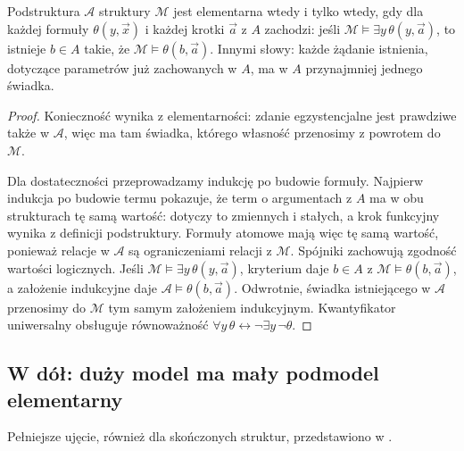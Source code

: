\begin{lemat}\label{res:14:4}
Podstruktura $\mathcal A$ struktury $\mathcal M$ jest elementarna wtedy i tylko wtedy, gdy dla każdej formuły $\theta(y,\vec x)$ i każdej krotki $\vec a$ z $A$ zachodzi: jeśli $\mathcal M\models\exists y\,\theta(y,\vec a)$, to istnieje $b\in A$ takie, że $\mathcal M\models\theta(b,\vec a)$. Innymi słowy: każde żądanie istnienia, dotyczące parametrów już zachowanych w $A$, ma w $A$ przynajmniej jednego świadka.
\end{lemat}
\begin{proof}
Konieczność wynika z elementarności: zdanie egzystencjalne jest prawdziwe także w $\mathcal A$, więc ma tam świadka, którego własność przenosimy z powrotem do $\mathcal M$.

Dla dostateczności przeprowadzamy indukcję po budowie formuły. Najpierw indukcja po budowie termu pokazuje, że term o argumentach z $A$ ma w obu strukturach tę samą wartość: dotyczy to zmiennych i stałych, a krok funkcyjny wynika z definicji podstruktury. Formuły atomowe mają więc tę samą wartość, ponieważ relacje w $\mathcal A$ są ograniczeniami relacji z $\mathcal M$. Spójniki zachowują zgodność wartości logicznych. Jeśli $\mathcal M\models\exists y\,\theta(y,\vec a)$, kryterium daje $b\in A$ z $\mathcal M\models\theta(b,\vec a)$, a założenie indukcyjne daje $\mathcal A\models\theta(b,\vec a)$. Odwrotnie, świadka istniejącego w $\mathcal A$ przenosimy do $\mathcal M$ tym samym założeniem indukcyjnym. Kwantyfikator uniwersalny obsługuje równoważność $\forall y\,\theta\leftrightarrow\neg\exists y\,\neg\theta$.
\end{proof}

\subsection*{W dół: duży model ma mały podmodel elementarny}\label{sec:14:2}
Pełniejsze ujęcie, również dla skończonych struktur, przedstawiono w .

